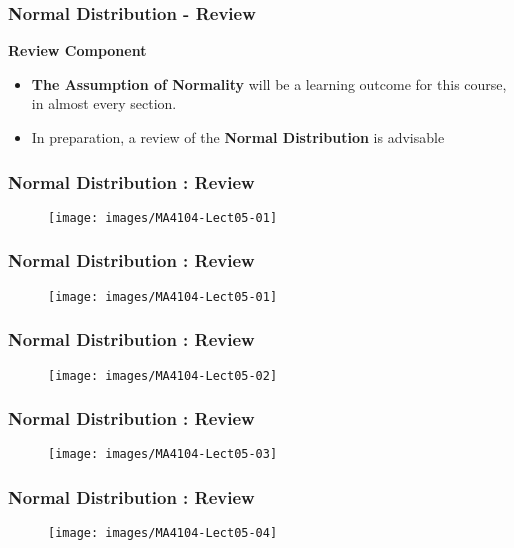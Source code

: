 \documentclass{beamer}
\begin{document}
	\begin{frame}
		\frametitle{Normal Distribution - Review}
		\Large
		\noindent \textbf{Review Component}
		\begin{itemize}
			\item \textbf{The Assumption of Normality} will be a learning outcome for this course, in almost every section.
			\item In preparation, a review of the \textbf{Normal Distribution} is advisable
		\end{itemize}
	\end{frame}
	\begin{frame}
		\frametitle{Normal Distribution : Review}
		\begin{figure}
			\centering
			\texttt{[image: images/MA4104-Lect05-01]}
			\caption{}
			\label{fig:MA4104-Lect05-01}
		\end{figure}
	\end{frame}
	\begin{frame}
		\frametitle{Normal Distribution : Review}
		\begin{figure}
			\centering
			\texttt{[image: images/MA4104-Lect05-01]}
		\end{figure}
	\end{frame}
	\begin{frame}
		\frametitle{Normal Distribution : Review}
		\begin{figure}
			\centering
			\texttt{[image: images/MA4104-Lect05-02]}
		\end{figure}
	\end{frame}
	\begin{frame}
		\frametitle{Normal Distribution : Review}
		\begin{figure}
			\centering
			\texttt{[image: images/MA4104-Lect05-03]}
			
		\end{figure}
	\end{frame}
	\begin{frame}
		\frametitle{Normal Distribution : Review}
		\begin{figure}
			\centering
			\texttt{[image: images/MA4104-Lect05-04]}
			
		\end{figure}
	\end{frame}
\end{document}
